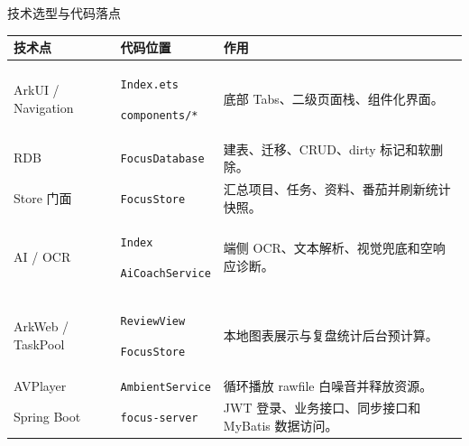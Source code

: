 \documentclass{beamer}
\newcommand{\codesmall}[1]{\texttt{\scriptsize #1}}
\begin{document}
\begin{frame}{技术选型与代码落点}
  \small
  \begin{tabularx}{\linewidth}{p{2.0cm}p{3.35cm}X}
    \toprule
    技术点 & 代码位置 & 作用 \\
    \midrule
    ArkUI / Navigation & \codesmall{Index.ets}\par\codesmall{components/*} & 底部 Tabs、二级页面栈、组件化界面。 \\
    RDB & \codesmall{FocusDatabase} & 建表、迁移、CRUD、dirty 标记和软删除。 \\
    Store 门面 & \codesmall{FocusStore} & 汇总项目、任务、资料、番茄并刷新统计快照。 \\
    AI / OCR & \codesmall{Index}\par\codesmall{AiCoachService} & 端侧 OCR、文本解析、视觉兜底和空响应诊断。 \\
    ArkWeb / TaskPool & \codesmall{ReviewView}\par\codesmall{FocusStore} & 本地图表展示与复盘统计后台预计算。 \\
    AVPlayer & \codesmall{AmbientService} & 循环播放 rawfile 白噪音并释放资源。 \\
    Spring Boot & \codesmall{focus-server} & JWT 登录、业务接口、同步接口和 MyBatis 数据访问。 \\
    \bottomrule
  \end{tabularx}
\end{frame}

\end{document}
